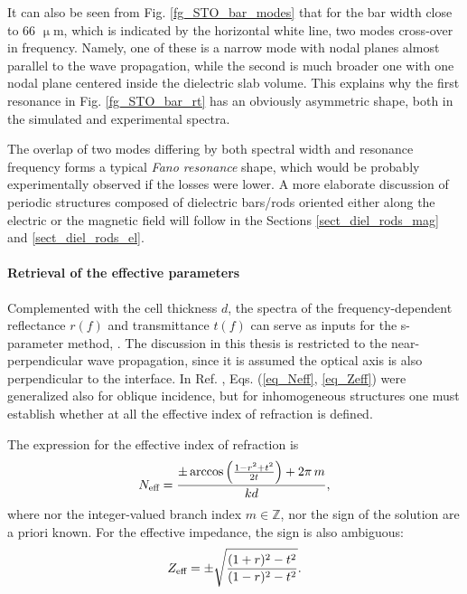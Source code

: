 It can also be seen from Fig. \ref{fg_STO_bar_modes} that for the bar width close to 66 $\upmu$m, which is indicated by the horizontal white line, two modes cross-over in frequency. Namely, one of these is a narrow mode with nodal planes almost parallel to the wave propagation, while the second is much broader one with one nodal plane centered inside the dielectric slab volume. This explains why the first resonance in Fig. \ref{fg_STO_bar_rt} has an obviously asymmetric shape, both in the simulated and experimental spectra. 

The overlap of two modes differing by both spectral width and resonance frequency forms a typical \textit{Fano resonance} shape, which would be probably experimentally observed if the losses were lower.
A more elaborate discussion of periodic structures composed of dielectric bars/rods oriented either along the electric or the magnetic field will follow in the Sections \ref{sect_diel_rods_mag} and \ref{sect_diel_rods_el}.
\paragraph{Retrieval of the effective parameters} %
Complemented with the cell thickness $d$, the spectra of the frequency-dependent reflectance $r(f)$ and transmittance $t(f)$ can serve as inputs for the s-parameter method,  \cite{smith2002determination, smith2005electromagnetic} \cite[pp. 51-55]{shalaev2010book}. 
The discussion in this thesis is restricted to the near-perpendicular wave propagation, since it is assumed the optical axis is also perpendicular to the interface. In Ref. \cite{menzel2008retrieving}, Eqs. (\ref{eq_Neff}, \ref{eq_Zeff}) were generalized also for oblique incidence, but for inhomogeneous structures one must establish whether at all the effective index of refraction is defined.

The expression for the effective index of refraction is
\begin{equation} N_{\text{eff} } = \frac{\pm \arccos\left(\frac{1 - r^2+t^2}{2 t}\right) + 2\pi\,m}{k d}, \label{eq_Neff} \end{equation}
where nor the integer-valued branch index $m\in \mathbb{Z}$, nor the sign of the solution are a priori known. For the effective impedance, the sign is also ambiguous: 
\begin{equation} Z_{\text{eff} } = \pm \sqrt{\frac{(1+r)^2 - t^2}{(1-r)^2 - t^2}}. \label{eq_Zeff} \end{equation}

